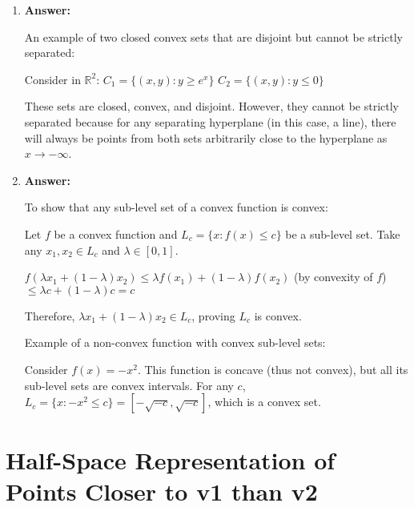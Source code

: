 \documentclass{article}
\newenvironment{answer}
    {\par\noindent\textbf{Answer:}\par}
    {\par}
\begin{document}
\begin{enumerate}
\begin{enumerate}
\begin{enumerate}
        \item 
        \begin{answer}
        An example of two closed convex sets that are disjoint but cannot be strictly separated:
        
        Consider in $\mathbb{R}^2$:
        $C_1 = \{(x,y) : y \geq e^x\}$
        $C_2 = \{(x,y) : y \leq 0\}$
        
        These sets are closed, convex, and disjoint. However, they cannot be strictly separated because for any separating hyperplane (in this case, a line), there will always be points from both sets arbitrarily close to the hyperplane as $x \to -\infty$.
        \end{answer}

        \item 
        \begin{answer}
        To show that any sub-level set of a convex function is convex:
        
        Let $f$ be a convex function and $L_c = \{x : f(x) \leq c\}$ be a sub-level set.
        Take any $x_1, x_2 \in L_c$ and $\lambda \in [0,1]$.
        
        $f(\lambda x_1 + (1-\lambda)x_2) \leq \lambda f(x_1) + (1-\lambda)f(x_2)$ (by convexity of $f$)
        $\leq \lambda c + (1-\lambda)c = c$
        
        Therefore, $\lambda x_1 + (1-\lambda)x_2 \in L_c$, proving $L_c$ is convex.
        
        Example of a non-convex function with convex sub-level sets:
        
        Consider $f(x) = -x^2$. This function is concave (thus not convex), but all its sub-level sets are convex intervals. For any $c$, $L_c = \{x : -x^2 \leq c\} = [-\sqrt{-c}, \sqrt{-c}]$, which is a convex set.
        \end{answer}
    \end{enumerate}
\end{enumerate}


\end{enumerate}

\section{Half-Space Representation of Points Closer to v1 than v2}
\end{document}
